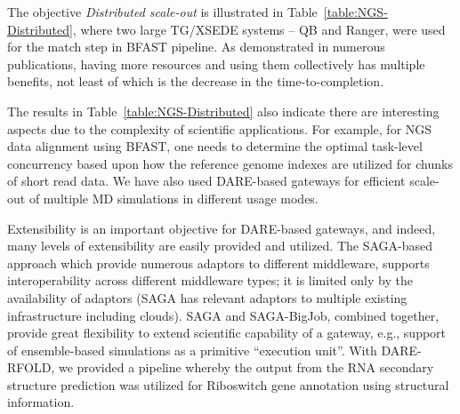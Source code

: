 \documentclass[]{svjour3}
\begin{document}
The objective {\it Distributed scale-out} is illustrated in
Table~\ref{table:NGS-Distributed}, where two large TG/XSEDE systems -- QB
and Ranger, were used for the match step in BFAST pipeline. As
demonstrated in numerous publications, having more resources and using
them collectively has multiple benefits, not least of which is the
decrease in the time-to-completion.


The results in Table~\ref{table:NGS-Distributed} also indicate there
are interesting aspects due to the complexity of scientific
applications. For example, for NGS data alignment using BFAST, one
needs to determine the optimal task-level concurrency based upon how
the reference genome indexes are utilized for chunks of short read
data\cite{ecmls11}. We have also used DARE-based gateways for
efficient scale-out of multiple MD simulations in different usage
modes.



Extensibility is an important objective for DARE-based gateways, and
indeed, many levels of extensibility are easily provided and utilized.
The SAGA-based approach which provide numerous adaptors to different
middleware, supports interoperability across different middleware
types; it is limited only by the availability of adaptors (SAGA has
relevant adaptors to multiple existing infrastructure including
clouds). SAGA and SAGA-BigJob, combined together,
provide great flexibility to extend scientific capability of a
gateway, e.g., support of ensemble-based simulations as a primitive
``execution unit''. With DARE-RFOLD, we provided a pipeline whereby
the output from the RNA secondary structure prediction
was utilized for Riboswitch gene annotation using structural
information. %
\end{document}
